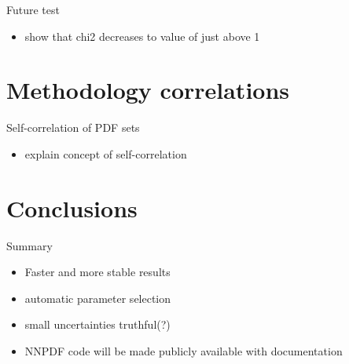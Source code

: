 \documentclass[aspectratio=169]{beamer}
\begin{document}
\begin{frame}{Future test}
    \begin{itemize}
        \item show that chi2 decreases to value of just above 1
    \end{itemize}
\end{frame}



\section{Methodology correlations}

\begin{frame}{Self-correlation of PDF sets}
      \begin{itemize}
        \item explain concept of self-correlation
    \end{itemize}
\end{frame}


\section{Conclusions}


\begin{frame}{Summary}
    \begin{itemize}
        \item Faster and more stable results
        \item automatic parameter selection
        \item small uncertainties truthful(?)
        \item NNPDF code will be made publicly available with documentation
    \end{itemize}
\end{frame}
\end{document}
